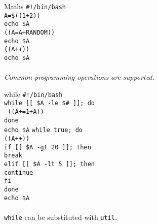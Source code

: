\documentclass{beamer}
\let\tt\texttt
\let\it\itshape
\begin{document}
\begin{frame}{Maths}
        \tt{\#!/bin/bash}                       \\
        \tt{A=\$((1+2))}                        \\
        \tt{echo \$A}                           \\
        \tt{((A=A+RANDOM))}                     \\
        \tt{echo \$A}                           \\
        \tt{((A++))}                            \\
        \tt{echo \$A}                           \\
        \quad                                   \\
        {\it Common programming operations are supported.} \\
\end{frame}

\begin{frame}{while}
        \tt{\#!/bin/bash}                       \\
        \tt{while [[ \$A -le \$\# ]]; do}       \\
        \quad \tt{ ((A+=1+A)) }                 \\
        \tt{done}                               \\
        \tt{echo \$A}
        \tt{while true; do}                     \\
        \quad \tt{((A++))}                      \\
        \quad \tt{if [[ \$A -gt 20 ]]; then}    \\
        \quad \quad \tt{break}                  \\
        \quad \tt{elif [[ \$A -lt 5 ]]; then}   \\
        \quad \quad \tt{continue}               \\
        \quad \tt{fi}                           \\
        \tt{done}                               \\
        \tt{echo \$A}                           \\
        \quad                                   \\
        \tt{while} can be substituted with \tt{util}.
\end{frame}
\end{document}
